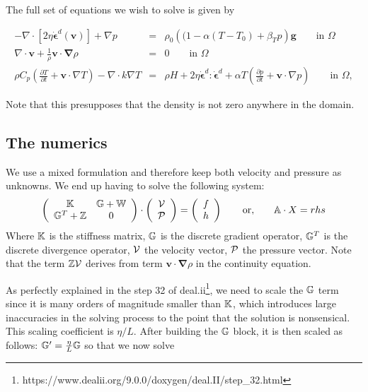 The full set of equations we wish to solve is given by

\begin{eqnarray}
-\nabla \cdot \left[2\eta \dot{\bm \epsilon}^d({\bm v}) \right] + \nabla p &=& \rho_0 \left((1 - \alpha(T-T_0) + \beta_T p \right) {\bm g} \quad\quad \textrm{in $\Omega$}  \label{eq:stokes-1a} \\
\nabla \cdot {\bm v} + \frac{1}{\rho} {\bm v} \cdot {\bm \nabla}\rho&=&0 \quad\quad  \textrm{in $\Omega$}   \label{eq:stokes-2a} \\
\rho C_p \left(\frac{\partial T}{\partial t} + \bm v\cdot\nabla T\right) - \nabla\cdot k\nabla T   &=& 
  \rho H  +  2\eta \dot{\bm \epsilon}^d : \dot{\bm \epsilon}^d    +\alpha T \left( \frac{\partial p}{\partial t}+  \bm v \cdot \nabla p \right) 
\quad\quad   \textrm{in $\Omega$},
  \label{eq:temperature}
\end{eqnarray}

Note that this presupposes that the density is not zero anywhere in the domain.


\subsection*{The numerics}

We use a mixed formulation and therefore  
keep both velocity and pressure as unknowns. We end up having to solve 
the following system:
\[
\left(
\begin{array}{cc}
{\mathbb{K}} & {\mathbb{G}}+{\mathbb{W}} \\ {\mathbb{G}}^T+{\mathbb{Z}} & 0 
\end{array}
\right)
\cdot
\left(
\begin{array}{c}
{\cal V} \\ {\cal P}
\end{array}
\right)
=
\left(
\begin{array}{c}
 f \\ h
\end{array}
\right)
\quad\quad
{\rm or,}
\quad\quad
{\mathbb{A}} \cdot X = rhs
\]
Where ${\mathbb{K}}$ is the stiffness matrix, ${\mathbb{G}}$ is the discrete gradient operator, 
${\mathbb{G}}^T$ is the discrete divergence operator, ${\cal V}$ the velocity vector, 
${\cal P}$ the pressure vector.
Note that the term ${\mathbb{Z}}{\cal V}$ derives from term ${\bm v} \cdot {\bm \nabla} \rho$ in the continuity equation. 

As perfectly explained in the step 32 of deal.ii\footnote{https://www.dealii.org/9.0.0/doxygen/deal.II/step\_32.html},
we need to scale the ${\mathbb{G}}$ term since it is many orders of magnitude smaller than ${\mathbb{K}}$, which introduces large inaccuracies in the solving process to the point that the solution is nonsensical. This scaling coefficient is $\eta/L$. After building the ${\mathbb{G}}$ block, it is then scaled as follows: ${\mathbb{G}}'=\frac{\eta}{L}{\mathbb{G}}$ so that we now solve 

